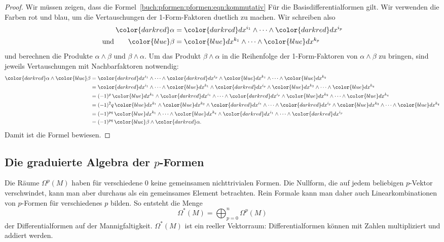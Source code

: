 \begin{proof}
Wir müssen zeigen, dass die
Formel~\eqref{buch:pformen:pformen:eqn:kommutativ}
Für die Basisdifferentialformen gilt.
Wir verwenden die Farben {\color{darkred}rot} und {\color{blue}blau},
um die Vertauschungen der 1-Form-Faktoren duetlich zu machen.
Wir schreiben also
\begin{align*}
{\color{darkred}\alpha}
&=
{\color{darkred}dx^{i_1}}
\wedge \dots \wedge
{\color{darkred}dx^{i_p}}
\\
\text{und}\qquad
{\color{blue}\beta}
&=
{\color{blue}dx^{k_1}}
\wedge \dots \wedge
{\color{blue}dx^{k_p}}
\end{align*}
und berechnen die Produkte $\alpha\wedge\beta$ und $\beta\wedge\alpha$.
Um das Produkt $\beta\wedge\alpha$ in die Reihenfolge der 1-Form-Faktoren
von $\alpha\wedge\beta$ zu bringen, sind jeweils Vertauschungen mit
Nachbarfaktoren notwendig:
\begin{align*}
{\color{darkred}\alpha}\wedge{\color{blue}\beta}
&=
{\color{darkred}dx^{i_1}}
\wedge\dots\wedge
{\color{darkred}dx^{i_p}}
\wedge
{\color{blue}dx^{k_1}}
\wedge\dots\wedge
{\color{blue}dx^{k_q}}
\\
&=
{\color{darkred}dx^{i_1}}
\wedge\dots\wedge
{\color{blue}dx^{k_1}}
\wedge
{\color{darkred}dx^{i_p}}
\wedge
{\color{blue}dx^{k_2}}
\wedge\dots\wedge
{\color{blue}dx^{k_q}}
\\
&=
(-1)^p
\,
{\color{blue}dx^{k_1}}
\wedge
{\color{darkred}dx^{i_1}}
\wedge\dots\wedge
{\color{darkred}dx^{i_p}}
\wedge
{\color{blue}dx^{k_2}}
\wedge\dots\wedge
{\color{blue} dx^{k_q}}
\\
&=
(-1)^2q
\,
{\color{blue}dx^{k_1}}
\wedge
{\color{blue}dx^{k_2}}
\wedge
{\color{darkred}dx^{i_1}}
\wedge\dots\wedge
{\color{darkred}dx^{i_p}}
\wedge
{\color{blue}dx^{k_3}}
\wedge\dots\wedge
{\color{blue} dx^{k_q}}
\\
&=
(-1)^{pq}
\,
{\color{blue}dx^{k_1}}
\wedge\dots\wedge
{\color{blue}dx^{k_q}}
\wedge
{\color{darkred}dx^{i_1}}
\wedge\dots\wedge
{\color{darkred}dx^{i_p}}
\\
&=
(-1)^{pq}
\,
{\color{blue}\beta}\wedge{\color{darkred}\alpha}.
\end{align*}
Damit ist die Formel bewiesen.
\end{proof}

%
%
\subsection{Die graduierte Algebra der $p$-Formen}
Die Räume $\Omega^p(M)$ haben für verschiedene $0$ keine gemeinsamen 
nichttrivialen Formen.
Die Nullform, die auf jedem beliebigen $p$-Vektor verschwindet, kann man
aber durchaus als ein gemeinsames Element betrachten.
Rein Formale kann man daher auch Linearkombinationen von $p$-Formen für
verschiedenes $p$ bilden.
So entsteht die Menge
\[
\Omega^*(M)
=
\bigoplus_{p=0}^n \Omega^p (M)
\]
der Differentialformen auf der Mannigfaltigkeit.
$\Omega^*(M)$ ist ein reeller Vektorraum: Differentialformen können mit
Zahlen multipliziert und addiert werden.

